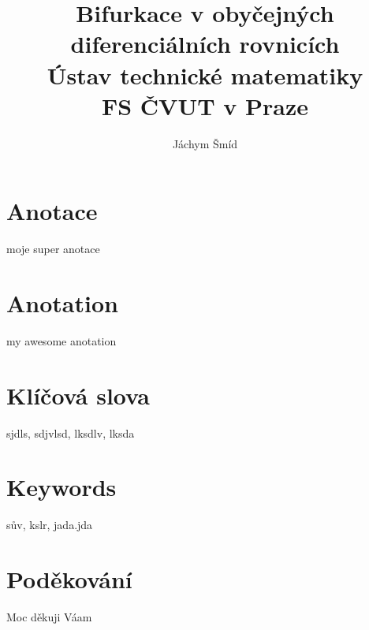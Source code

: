 \documentclass[12pt,a4paper, fleqn, twoside]{report}
\date{}
\title{\textbf{Bifurkace v obyčejných diferenciálních rovnicích}\\[2ex]\large{Ústav technické matematiky\\ FS ČVUT v Praze}}
\author{Jáchym Šmíd}
\begin{document}
\setlength{\mathindent}{15pt}
\pagestyle{headings}
\newcommand\myemptypage{
    \null
    \thispagestyle{empty}
    \newpage
    }
\setlength{\parskip}{0.5em}
    

\maketitle
\thispagestyle{empty}
\pagebreak

\myemptypage

\thispagestyle{empty}
\section*{Anotace}
moje super anotace
\section*{Anotation}
my awesome anotation
\section*{Klíčová slova}
sjdls, sdjvlsd, lksdlv, lksda
\section*{Keywords}	
sův, kslr, jada.jda
\section*{Poděkování}
Moc děkuji Váam
\pagebreak

\thispagestyle{empty}
\tableofcontents
\pagebreak

\thispagestyle{empty}
\listoffigures
\pagebreak

\thispagestyle{empty}
\end{document}
